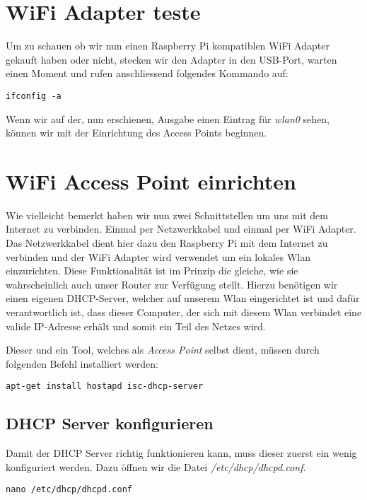 \section{WiFi Adapter teste}
Um zu schauen ob wir nun einen Raspberry Pi kompatiblen WiFi Adapter gekauft haben oder nicht, stecken wir den Adapter in den USB-Port, warten einen Moment und rufen anschliessend folgendes Kommando auf:

\begin{lstlisting}
ifconfig -a
\end{lstlisting}

Wenn wir auf der, nun erschienen, Ausgabe einen Eintrag für \textit{wlan0} sehen, können wir mit der Einrichtung des Access Points beginnen.

\section{WiFi Access Point einrichten}
Wie vielleicht bemerkt haben wir nun zwei Schnittstellen um uns mit dem Internet zu verbinden. Einmal per Netzwerkkabel und einmal per WiFi Adapter.
Das Netzwerkkabel dient hier dazu den Raspberry Pi mit dem Internet zu verbinden und der WiFi Adapter wird verwendet um ein lokales Wlan einzurichten. Diese Funktionalität ist im Prinzip die gleiche, wie sie wahrscheinlich auch unser Router zur Verfügung stellt.
Hierzu benötigen wir einen eigenen DHCP-Server, welcher auf unserem Wlan eingerichtet ist und dafür verantwortlich ist, dass dieser Computer, der sich mit diesem Wlan verbindet eine valide IP-Adresse erhält und somit ein Teil des Netzes wird.

Dieser und ein Tool, welches als \textit{Access Point} selbst dient, müssen durch folgenden Befehl installiert werden:

\begin{lstlisting}
apt-get install hostapd isc-dhcp-server
\end{lstlisting}

\subsection{DHCP Server konfigurieren}
Damit der DHCP Server richtig funktionieren kann, muss dieser zuerst ein wenig konfiguriert werden.
Dazu öffnen wir die Datei \textit{/etc/dhcp/dhcpd.conf}.

\begin{lstlisting}
nano /etc/dhcp/dhcpd.conf
\end{lstlisting}

